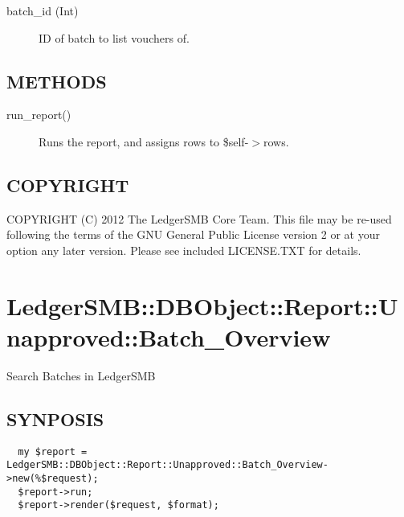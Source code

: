 \begin{description}
\begin{description}
\begin{description}
\begin{description}
\begin{description}
\begin{description}
\begin{description}
\begin{description}
\begin{description}
\begin{description}
\begin{description}

\item[{batch\_id (Int)}] \mbox{}

ID of batch to list vouchers of.

\end{description}
\subsection*{METHODS\label{LedgerSMB::DBObject::Report::Unapproved::Batch_Detail_METHODS}}
\begin{description}

\item[{run\_report()}] \mbox{}

Runs the report, and assigns rows to \$self-$>$rows.

\end{description}
\subsection*{COPYRIGHT\label{LedgerSMB::DBObject::Report::Unapproved::Batch_Detail_COPYRIGHT}}


COPYRIGHT (C) 2012 The LedgerSMB Core Team.  This file may be re-used following
the terms of the GNU General Public License version 2 or at your option any
later version.  Please see included LICENSE.TXT for details.

\section{LedgerSMB::DBObject::Report::Unapproved::Batch\_Overview\label{LedgerSMB::DBObject::Report::Unapproved::Batch_Overview}}


Search Batches in 
LedgerSMB

\subsection*{SYNPOSIS\label{LedgerSMB::DBObject::Report::Unapproved::Batch_Overview_SYNPOSIS}}
\begin{verbatim}
  my $report = LedgerSMB::DBObject::Report::Unapproved::Batch_Overview->new(%$request);
  $report->run;
  $report->render($request, $format);
\end{verbatim}

\end{description}
\end{description}
\end{description}
\end{description}
\end{description}
\end{description}
\end{description}
\end{description}
\end{description}
\end{description}
